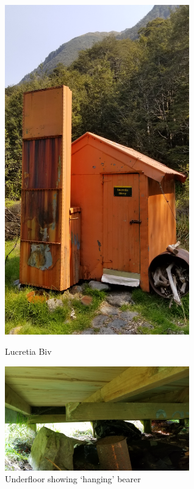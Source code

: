 \documentclass[12pt]{article} %
\begin{document}
\begin{figure}[ht]
\begin{minipage}{.5\linewidth}
\begin{center}
  \includegraphics[width=8cm, angle=270]{LucretiaBivReport23Nov2019Photo1}
  \caption{Lucretia Biv}
  \label{LB01}
\end{center}
\end{minipage}
\begin{minipage}{.5\linewidth}
\begin{center}
  \includegraphics[width=8cm]{LucretiaBivReport23Nov2019Photo2}
  \caption{Underfloor showing `hanging' bearer}
  \label{LB02}
\end{center}
\end{minipage}
\end{figure}
\end{document}
